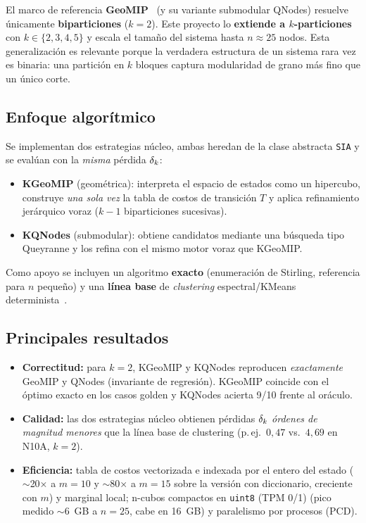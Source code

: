\documentclass[11pt,letterpaper]{article}
\begin{document}
El marco de referencia \textbf{GeoMIP}~\cite{geomip} (y su variante submodular QNodes)
resuelve únicamente \textbf{biparticiones}
($k=2$). Este proyecto lo \textbf{extiende a $k$-particiones} con
$k \in \{2,3,4,5\}$ y escala el tamaño del sistema hasta $n \approx 25$ nodos.
Esta generalización es relevante porque la verdadera estructura de un sistema
rara vez es binaria: una partición en $k$ bloques captura modularidad de grano
más fino que un único corte.

\subsection{Enfoque algorítmico}
Se implementan dos estrategias núcleo, ambas heredan de la clase abstracta
\texttt{SIA} y se evalúan con la \emph{misma} pérdida $\delta_k$:
\begin{itemize}
	\item \textbf{KGeoMIP} (geométrica): interpreta el espacio de estados como un
	      hipercubo, construye \emph{una sola vez} la tabla de costos de transición $T$
	      y aplica refinamiento jerárquico voraz ($k-1$ biparticiones sucesivas).
	\item \textbf{KQNodes} (submodular): obtiene candidatos mediante una búsqueda
	      tipo Queyranne y los refina con el mismo motor voraz que KGeoMIP.
\end{itemize}
Como apoyo se incluyen un algoritmo \textbf{exacto} (enumeración de Stirling,
referencia para $n$ pequeño) y una \textbf{línea base} de \emph{clustering}
espectral/KMeans determinista~\cite{vonluxburg}.

\subsection{Principales resultados}
\begin{itemize}
	\item \textbf{Correctitud:} para $k=2$, KGeoMIP y KQNodes reproducen
	      \emph{exactamente} GeoMIP y QNodes (invariante de regresión). KGeoMIP coincide
	      con el óptimo exacto en los casos golden y KQNodes acierta 9/10 frente al
	      oráculo.
	\item \textbf{Calidad:} las dos estrategias núcleo obtienen pérdidas
	      $\delta_k$ \emph{órdenes de magnitud menores} que la línea base de clustering
	      (p.\,ej.\ $0{,}47$ vs.\ $4{,}69$ en N10A, $k=2$).
	\item \textbf{Eficiencia:} tabla de costos vectorizada e indexada por el entero
	      del estado ($\sim$20× a $m{=}10$ y $\sim$80× a $m{=}15$ sobre la versión con
	      diccionario, creciente con $m$) y marginal local; n-cubos compactos en \texttt{uint8} (TPM 0/1)
	      (pico medido $\sim$6~GB a $n=25$, cabe en 16~GB) y paralelismo por procesos (PCD).
\end{itemize}
\end{document}
